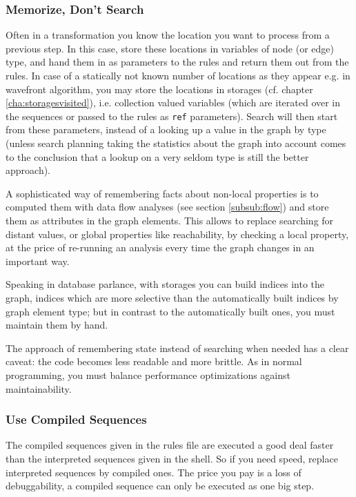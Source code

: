 \subsubsection*{Memorize, Don't Search}
Often in a transformation you know the location you want to process from a previous step.
In this case, store these locations in variables of node (or edge) type, and hand them in as parameters to the rules and return them out from the rules.
In case of a statically not known number of locations as they appear e.g. in wavefront algorithm, you may store the locations in storages (cf. chapter \ref{cha:storagesvisited}), i.e. collection valued variables (which are iterated over in the sequences or passed to the rules as \texttt{ref} parameters).
Search will then start from these parameters, instead of a looking up a value in the graph by type (unless search planning taking the statistics about the graph into account comes to the conclusion  that a lookup on a very seldom type is still the better approach).

A sophisticated way of remembering facts about non-local properties is to computed them with data flow analyses (see section \ref{subsub:flow}) and store them as attributes in the graph elements.
This allows to replace searching for distant values, or global properties like reachability, by checking a local property, at the price of re-running an analysis every time the graph changes in an important way.

Speaking in database parlance, with storages you can build indices into the graph, indices which are more selective than the automatically built indices by graph element type; but in contrast to the automatically built ones, you must maintain them by hand.

The approach of remembering state instead of searching when needed has a clear caveat: the code becomes less readable and more brittle. As in normal programming, you must balance performance optimizations against maintainability.

\subsubsection*{Use Compiled Sequences}
The compiled sequences given in the rules file are executed a good deal faster than the interpreted sequences given in the shell.
So if you need speed, replace interpreted sequences by compiled ones.
The price you pay is a loss of debuggability, a compiled sequence can only be executed as one big step.

